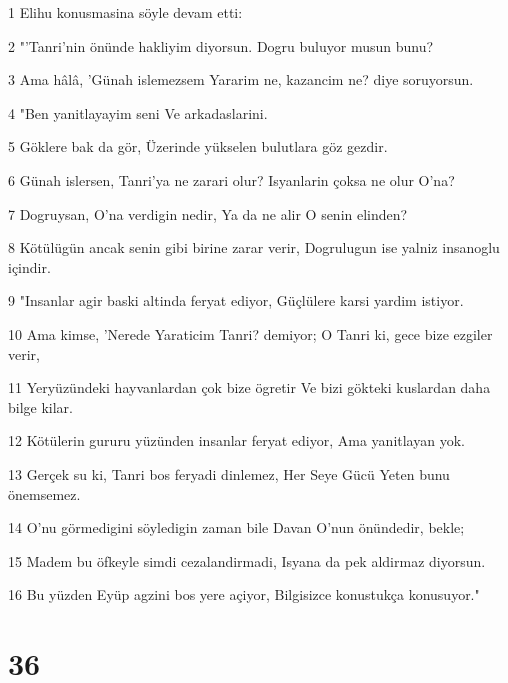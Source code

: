 \par 1 Elihu konusmasina söyle devam etti:
\par 2 "'Tanri'nin önünde hakliyim diyorsun. Dogru buluyor musun bunu?
\par 3 Ama hâlâ, 'Günah islemezsem Yararim ne, kazancim ne? diye soruyorsun.
\par 4 "Ben yanitlayayim seni Ve arkadaslarini.
\par 5 Göklere bak da gör, Üzerinde yükselen bulutlara göz gezdir.
\par 6 Günah islersen, Tanri'ya ne zarari olur? Isyanlarin çoksa ne olur O'na?
\par 7 Dogruysan, O'na verdigin nedir, Ya da ne alir O senin elinden?
\par 8 Kötülügün ancak senin gibi birine zarar verir, Dogrulugun ise yalniz insanoglu içindir.
\par 9 "Insanlar agir baski altinda feryat ediyor, Güçlülere karsi yardim istiyor.
\par 10 Ama kimse, 'Nerede Yaraticim Tanri? demiyor; O Tanri ki, gece bize ezgiler verir,
\par 11 Yeryüzündeki hayvanlardan çok bize ögretir Ve bizi gökteki kuslardan daha bilge kilar.
\par 12 Kötülerin gururu yüzünden insanlar feryat ediyor, Ama yanitlayan yok.
\par 13 Gerçek su ki, Tanri bos feryadi dinlemez, Her Seye Gücü Yeten bunu önemsemez.
\par 14 O'nu görmedigini söyledigin zaman bile Davan O'nun önündedir, bekle;
\par 15 Madem bu öfkeyle simdi cezalandirmadi, Isyana da pek aldirmaz diyorsun.
\par 16 Bu yüzden Eyüp agzini bos yere açiyor, Bilgisizce konustukça konusuyor."

\chapter{36}

